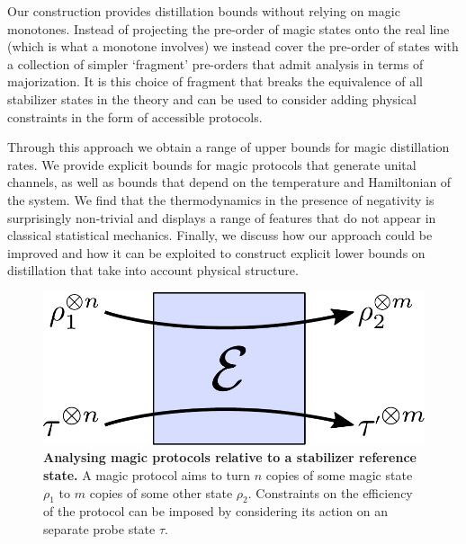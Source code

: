 \documentclass[pra,
aps,
twocolumn,
superscriptaddress,
groupedaddress,
nofootinbib,
reprint
]{revtex4-1}
\begin{document}
Our construction provides distillation bounds without relying on magic monotones. Instead of projecting the pre-order of magic states onto the real line (which is what a monotone involves) we instead cover the pre-order of states with a collection of simpler `fragment' pre-orders that admit analysis in terms of majorization. It is this choice of fragment that breaks the equivalence of all stabilizer states in the theory and can be used to consider adding physical constraints in the form of accessible protocols.

Through this approach we obtain a range of upper bounds for magic distillation rates. We provide explicit bounds for magic protocols that generate unital channels, as well as bounds that depend on the temperature and Hamiltonian of the system. We find that the thermodynamics in the presence of negativity is surprisingly non-trivial and displays a range of features that do not appear in classical statistical mechanics. 
Finally, we discuss how our approach could be improved and how it can be exploited to construct explicit lower bounds on distillation that take into account physical structure.

\begin{figure}[t]
    \centering
        \includegraphics[scale=0.4]{figs/protocol_diagram.pdf}
    \caption{\textbf{Analysing magic protocols relative to a stabilizer reference state.} 
	A magic protocol aims to turn $n$ copies of some magic state $\rho_1$ to $m$ copies of some other state $\rho_2$.
	Constraints on the efficiency of the protocol can be imposed by considering its action on an separate probe state $\tau$.
    }
    \label{fig:sketch}
\end{figure}
\end{document}
